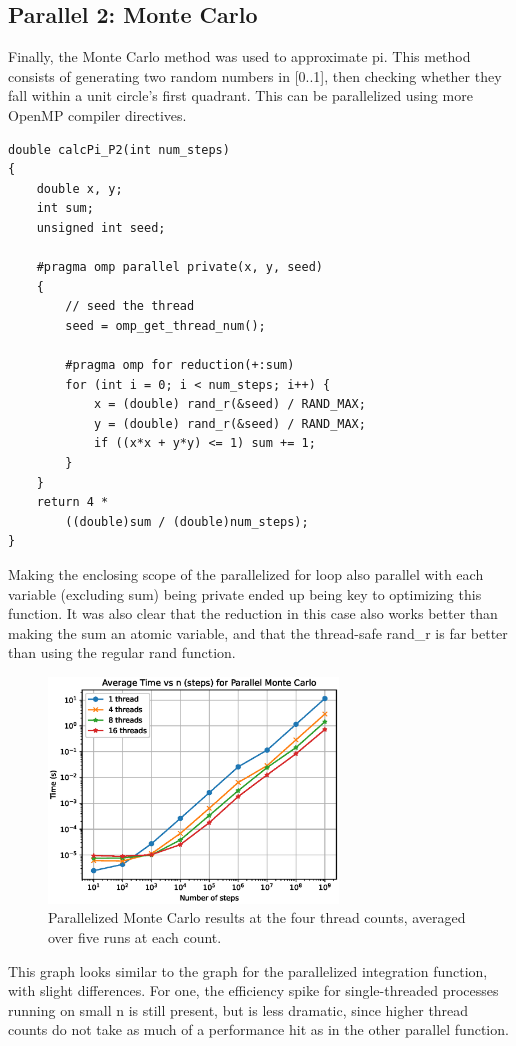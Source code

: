 \documentclass[a4paper]{article}
\begin{document}
\subsection{Parallel 2: Monte Carlo}
Finally, the Monte Carlo method was used to approximate pi. This method consists of generating two random numbers in [0..1], then checking whether they fall within a unit circle's first quadrant. This can be parallelized using more OpenMP compiler directives. 
\begin{verbatim}
double calcPi_P2(int num_steps)
{
	double x, y;
	int sum;
	unsigned int seed;

	#pragma omp parallel private(x, y, seed)
	{
		// seed the thread
		seed = omp_get_thread_num();
	
		#pragma omp for reduction(+:sum)
		for (int i = 0; i < num_steps; i++) {
			x = (double) rand_r(&seed) / RAND_MAX;
			y = (double) rand_r(&seed) / RAND_MAX;
			if ((x*x + y*y) <= 1) sum += 1;
		}
	} 
	return 4 * 
        ((double)sum / (double)num_steps);	
}
\end{verbatim}

Making the enclosing scope of the parallelized for loop also parallel with each variable (excluding sum) being private ended up being key to optimizing this function. It was also clear that the reduction in this case also works better than making the sum an atomic variable, and that the thread-safe rand\_r is far better than using the regular rand function. 

\begin{figure}[ht]
\begin{center}
\includegraphics[height=6cm]{carlo.eps}
\caption{Parallelized Monte Carlo results at the four thread counts, averaged over five runs at each count.}
\label{fig3}
\end{center}
\end{figure}

This graph looks similar to the graph for the parallelized integration function, with slight differences. For one, the efficiency spike for single-threaded processes running on small n is still present, but is less dramatic, since higher thread counts do not take as much of a performance hit as in the other parallel function. 
\end{document}
